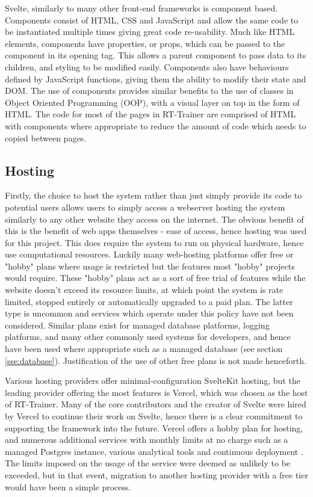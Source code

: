 Svelte, similarly to many other front-end frameworks is component based. Components consist of HTML, CSS and JavaScript and allow the same code to be instantiated multiple times giving great code re-usability. Much like HTML elements, components have properties, or props, which can be passed to the component in its opening tag. This allows a parent component to pass data to its children, and styling to be modified easily. Components also have behaviours defined by JavaScript functions, giving them the ability to modify their state and DOM. The use of components provides similar benefits to the use of classes in Object Oriented Programming (OOP), with a visual layer on top in the form of HTML. The code for most of the pages in RT-Trainer are comprised of HTML with components where appropriate to reduce the amount of code which needs to copied between pages.

\subsection{Hosting}
\label{sse:hosting}
Firstly, the choice to host the system rather than just simply provide its code to potential users allows users to simply access a webserver hosting the system similarly to any other website they access on the internet. The obvious benefit of this is the benefit of web apps themselves - ease of access, hence hosting was used for this project. This does require the system to run on physical hardware, hence use computational resources. Luckily many web-hosting platforms offer free or "hobby" plans where usage is restricted but the features most "hobby" projects would require. These "hobby" plans act as a sort of free trial of features while the website doesn't exceed its resource limits, at which point the system is rate limited, stopped entirely or automatically upgraded to a paid plan. The latter type is uncommon and services which operate under this policy have not been considered. Similar plans exist for managed database platforms, logging platforms, and many other commonly used systems for developers, and hence have been used where appropriate such as a managed database (see section \ref{sse:database}). Justification of the use of other free plans is not made henceforth.

Various hosting providers offer minimal-configuration SvelteKit hosting, but the leading provider offering the most features is Vercel, which was chosen as the host of RT-Trainer. Many of the core contributors and the creator of Svelte were hired by Vercel to continue their work on Svelte, hence there is a clear commitment to supporting the framework into the future. Vercel offers a hobby plan for hosting, and numerous additional services with monthly limits at no charge such as a managed Postgres instance, various analytical tools and continuous deployment \cite{vercel-hobby-plan}. The limits imposed on the usage of the service were deemed as unlikely to be exceeded, but in that event, migration to another hosting provider with a free tier would have been a simple process.

